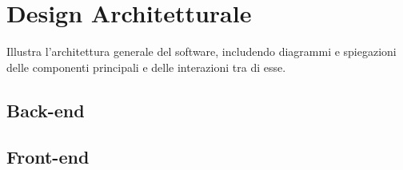 \section{Design Architetturale}\label{sec:Design}
Illustra l'architettura generale del software, includendo diagrammi e spiegazioni delle componenti principali e delle interazioni tra di esse.
\subsection{Back-end}\label{ssec:BackEnd}
\subsection{Front-end}\label{ssec:FrontEnd}
\newpage